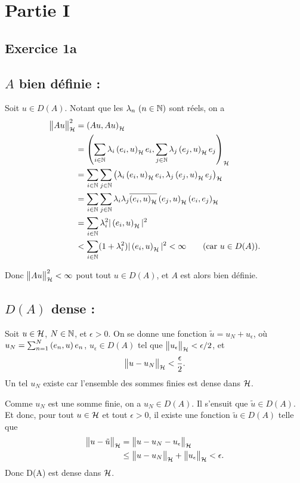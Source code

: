 

\section*{Partie I}

\subsection*{Exercice 1a}

\subsection*{$A$ bien définie :}

Soit $u \in D(A)$. Notant que les $\lambda_n \ ({n \in \mathbb{N}})$ sont
réels, on a
\begin{align}
    \normeh{Au}^2 &= \psh{Au}{Au} \\
    &= \psh{\sum_\inn{i} \lambda_i \psh{e_i}{u} e_i}
    {\sum_\inn{j} \lambda_j \psh{e_j}{u} e_j} \\
    &= \sum_\inn{i} \sum_\inn{j} \psh{\lambda_i \psh{e_i}{u} e_i}
    {\lambda_j \psh{e_j}{u} e_j} \\
    &= \sum_\inn{i} \sum_\inn{j} \lambda_i \lambda_j
    \overline{\psh{e_i}{u}} \psh{e_j}{u}
    \psh{e_i}{e_j} \\
%
    &= \sum_\inn{i} \lambda_i^2 |\psh{e_i}{u}|^2 \\
%
    & < \sum_\inn{i} (1 + \lambda_i^2) |\psh{e_i}{u}|^2
    < \infty \qquad (\text{car } u \in D(A)).
\end{align}

Donc $\big\| Au \big\|_{\mathcal{H}}^2 < \infty$ pout tout $u \in D(A)$, et $A$
est alors bien définie.

\subsection*{$D(A)$ dense :}

Soit $u \in \mathcal{H}$, $N \in \mathbb{N}$, et $\epsilon > 0$. On se donne
une fonction $\tilde u = u_N + u_\epsilon$, où
$u_N = \sum_{n=1}^N \left( e_n, u \right) e_n$,
$u_\epsilon \in D(A)$ tel que
$\big\| u_\epsilon \big\|_{\mathcal{H}} < \epsilon/2$, et
\begin{align}
    \big\| u - u_N \big\|_{\mathcal{H}} < \frac{\epsilon}{2}.
\end{align}
%
Un tel $u_N$ existe car l'ensemble des sommes finies est
dense dans $\mathcal{H}$.

Comme $u_N$ est une somme
finie, on a $u_N \in D(A)$. Il s'ensuit que $\tilde u \in D(A)$.
Et donc, pour tout $u \in \mathcal{H}$ et tout $\epsilon > 0$,
il existe une fonction $\tilde u \in D(A)$ telle que
\begin{align}
    \big\| u - \tilde u \big\|_{\mathcal{H}} &= \big\| u - u_N - u_\epsilon \big\|_{\mathcal{H}} \\
    & \leq \big\| u - u_N \big\|_{\mathcal{H}} + \big\| u_\epsilon \big\|_{\mathcal{H}} < \epsilon.
\end{align}
%
Donc D(A) est dense dans $\mathcal{H}$.

